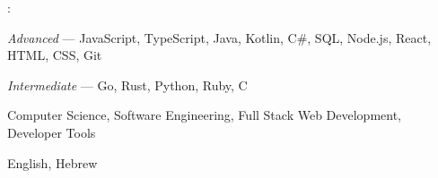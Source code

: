 
\begin{cvparagraph}
    : 
    \vspace{-1.0mm}
    \begin{plaincvitems}
        \item {\itshape Advanced} --- JavaScript, TypeScript, Java, Kotlin, C\#, SQL, Node.js, React, HTML, CSS, Git
        \item {\itshape Intermediate} --- Go, Rust, Python, Ruby, C
    \end{plaincvitems}
    
    \vspace{-0.5mm}

     Computer Science, Software Engineering, Full Stack Web Development, Developer Tools
    
    \vspace{-1.0mm}

     English, Hebrew
\end{cvparagraph}
